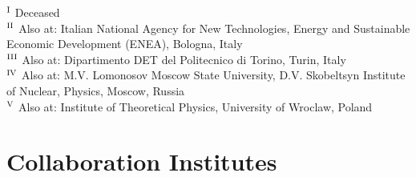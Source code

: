 \begin{flushleft}
$^{\rm I}$ Deceased\\
$^{\rm II}$ Also at: Italian National Agency for New Technologies, Energy and Sustainable Economic Development (ENEA), Bologna, Italy\\
$^{\rm III}$ Also at: Dipartimento DET del Politecnico di Torino, Turin, Italy\\
$^{\rm IV}$ Also at: M.V. Lomonosov Moscow State University, D.V. Skobeltsyn Institute of Nuclear, Physics, Moscow, Russia\\
$^{\rm V}$ Also at: Institute of Theoretical Physics, University of Wroclaw, Poland\\


\section*{Collaboration Institutes}


\end{flushleft}
